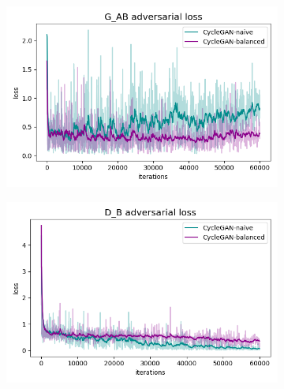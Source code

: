 \begin{figure}[h!]
    \begin{subfigure}{.5\textwidth}
        \centering
        \includegraphics[width=.95\linewidth]{figures/Expt_2/gan_convergence/loss_G_AB.png}
        \caption{}
        \label{fig:loss_G_AB}
    \end{subfigure}
    \begin{subfigure}{.5\textwidth}
        \centering
        \includegraphics[width=.95\linewidth]{figures/Expt_2/gan_convergence/loss_D_B.png}
        \caption{}
        \label{fig:loss_D_B}
    \end{subfigure}
    \newline


\end{figure}
